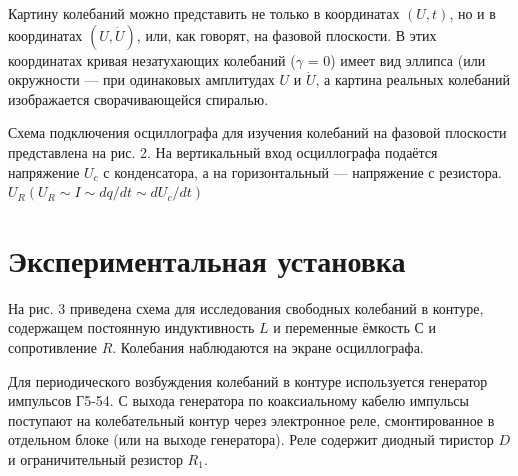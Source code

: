 \documentclass[a4paper,12pt]{article}
\begin{document}
\par Картину колебаний можно представить не только в координатах $(U, t)$, но и в координатах $(U, \dot{U})$, или, как говорят, на фазовой плоскости. В этих координатах кривая незатухающих колебаний ($\gamma $ = 0) имеет вид эллипса (или окружности — при одинаковых амплитудах $U$ и $\dot{U}$, а картина реальных колебаний изображается сворачивающейся спиралью. 

\par Схема подключения осциллографа для изучения колебаний на фазовой плоскости представлена на рис. 2. На вертикальный вход осциллографа подаётся напряжение $U_c$ с конденсатора, а на горизонтальный — напряжение с резистора. $U_R (U_R \sim I \sim dq/dt \sim dU_c/dt) $


\section{Экспериментальная установка}

\par На рис. 3 приведена схема для исследования свободных колебаний в контуре, содержащем постоянную индуктивность $L$ и переменные ёмкость $С$ и сопротивление $R$.
Колебания наблюдаются на экране осциллографа.

\par Для периодического возбуждения колебаний в контуре используется генератор импульсов Г5-54. С выхода генератора по коаксиальному кабелю импульсы поступают на колебательный контур через электронное реле, смонтированное в отдельном блоке (или на выходе генератора). Реле содержит диодный тиристор $D$ и ограничительный резистор $R_1$.
\end{document}
